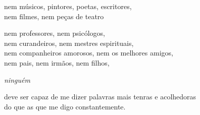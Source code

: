 nem músicos, pintores, poetas, escritores,\\
nem filmes, nem peças de teatro

nem professores, nem psicólogos,\\
nem curandeiros, nem mestres espirituais,\\
nem companheiros amorosos, nem os melhores amigos,\\
nem pais, nem irmãos, nem filhos,

\emph{ninguém}

deve ser capaz de me dizer palavras mais tenras e acolhedoras\\
do que as que me digo constantemente.
